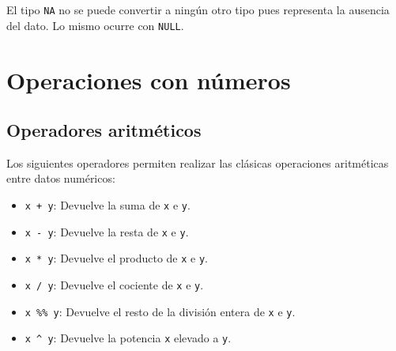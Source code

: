 \documentclass[
  a4paper,
]{scrreport}
\providecommand{\tightlist}{%
  \setlength{\itemsep}{0pt}\setlength{\parskip}{0pt}}\usepackage{longtable,booktabs,array}
\theoremstyle{definition}
\theoremstyle{definition}
\theoremstyle{remark}
\begin{document}
El tipo \texttt{NA} no se puede convertir a ningún otro tipo pues
representa la ausencia del dato. Lo mismo ocurre con \texttt{NULL}.

\section{Operaciones con números}\label{operaciones-con-nuxfameros}

\subsection{Operadores aritméticos}\label{operadores-aritmuxe9ticos}

Los siguientes operadores permiten realizar las clásicas operaciones
aritméticas entre datos numéricos:

\begin{itemize}
\tightlist
\item
  \texttt{x\ +\ y}: Devuelve la suma de \texttt{x} e \texttt{y}.
\item
  \texttt{x\ -\ y}: Devuelve la resta de \texttt{x} e \texttt{y}.
\item
  \texttt{x\ *\ y}: Devuelve el producto de \texttt{x} e \texttt{y}.
\item
  \texttt{x\ /\ y}: Devuelve el cociente de \texttt{x} e \texttt{y}.\\
\item
  \texttt{x\ \%\%\ y}: Devuelve el resto de la división entera de
  \texttt{x} e \texttt{y}.\\
\item
  \texttt{x\ \^{}\ y}: Devuelve la potencia \texttt{x} elevado a
  \texttt{y}.
\end{itemize}
\end{document}
